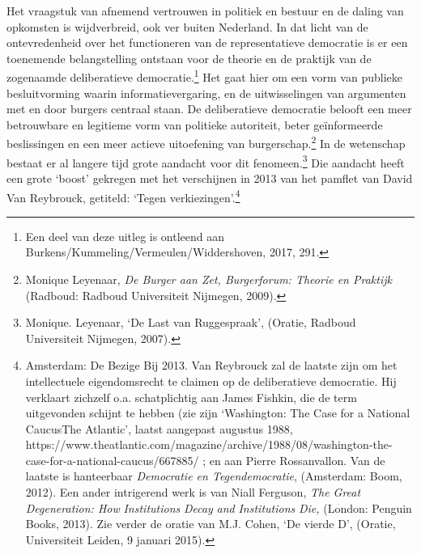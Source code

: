 \documentclass[smallauthor, chapterhaspagenum, nochapterinheader, pagenuminheader,  bigchapnum,medium2, tocpages,  garamond, titleinheader]{jote-book}
\begin{document}
	Het vraagstuk van afnemend vertrouwen in politiek en bestuur en de daling van opkomsten is wijdverbreid, ook ver buiten Nederland. In dat licht van de ontevredenheid over het functioneren van de representatieve democratie is er een toenemende belangstelling ontstaan voor de theorie en de praktijk van de zogenaamde deliberatieve democratie.\footnote{Een deel van deze uitleg is ontleend aan Burkens/Kummeling/Vermeulen/Widdershoven, 2017, 291.} Het gaat hier om een vorm van publieke besluitvorming waarin informatievergaring, en de uitwisselingen van argumenten met en door burgers centraal staan. De deliberatieve democratie belooft een meer betrouwbare en legitieme vorm van politieke autoriteit, beter geïnformeerde beslissingen en een meer actieve uitoefening van burgerschap.\footnote{Monique Leyenaar, \emph{De Burger aan Zet, Burgerforum: Theorie en Praktijk}\emph{ }(Radboud: Radboud Universiteit Nijmegen, 2009).} In de wetenschap bestaat er al langere tijd grote aandacht voor dit fenomeen.\footnote{Monique. Leyenaar, ‘De Last van Ruggespraak', (Oratie, Radboud Universiteit Nijmegen, 2007).} Die aandacht heeft een grote ‘boost' gekregen met het verschijnen in 2013 van het pamflet van David Van Reybrouck, getiteld: ‘Tegen verkiezingen'.\footnote{Amsterdam: De Bezige Bij 2013. Van Reybrouck zal de laatste zijn om het intellectuele eigendomsrecht te claimen op de deliberatieve democratie. Hij verklaart zichzelf o.a. schatplichtig aan James Fishkin, die de term uitgevonden schijnt te hebben (zie zijn ‘Washington: The Case for a National CaucusThe Atlantic', laatst aangepast augustus 1988, https://www.theatlantic.com/magazine/archive/1988/08/washington-the-case-for-a-national-caucus/667885/ ; en aan Pierre Rossanvallon. Van de laatste is hanteerbaar \emph{Democratie en Tegendemocratie}, (Amsterdam: Boom, 2012). Een ander intrigerend werk is van Niall Ferguson, \emph{The Great }\emph{Degeneration}\emph{: How }\emph{Institutions}\emph{ }\emph{Decay}\emph{ }\emph{and}\emph{ }\emph{Institutions}\emph{ Die,}\emph{ }(London: Penguin Books, 2013). Zie verder de oratie van M.J. Cohen, ‘De vierde D', (Oratie, Universiteit Leiden, 9 januari 2015).}
\end{document}

